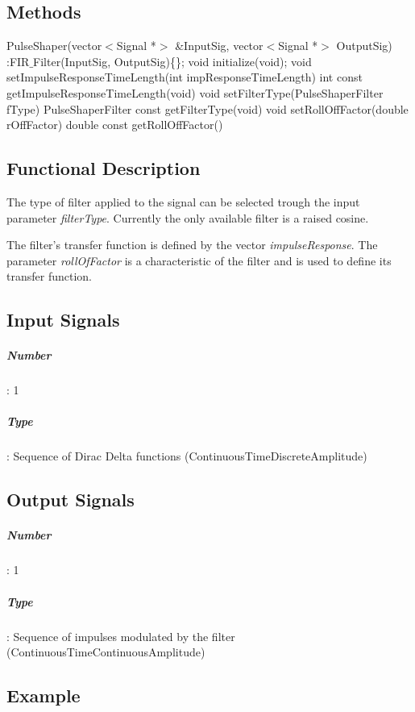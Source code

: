 \subsection*{Methods}

PulseShaper(vector$<$Signal *$>$ \&InputSig, vector$<$Signal *$>$ OutputSig) :FIR$\_$Filter(InputSig, OutputSig)\{\};
\bigbreak	
void initialize(void);
\bigbreak	
void setImpulseResponseTimeLength(int impResponseTimeLength)
\bigbreak
int const getImpulseResponseTimeLength(void)
\bigbreak	
void setFilterType(PulseShaperFilter fType)
\bigbreak
PulseShaperFilter const getFilterType(void)
\bigbreak	
void setRollOffFactor(double rOffFactor)
\bigbreak
double const getRollOffFactor()

\subsection*{Functional Description}

The type of filter applied to the signal can be selected trough the input parameter \textit{filterType}. Currently the only available filter is a raised cosine.

The filter's transfer function is defined by the vector \textit{impulseResponse}. The parameter \textit{rollOfFactor} is a characteristic of the filter and is used to define its transfer function.

\subsection*{Input Signals}

\subparagraph*{Number}: 1

\subparagraph*{Type}: Sequence of Dirac Delta functions (ContinuousTimeDiscreteAmplitude)

\subsection*{Output Signals}

\subparagraph*{Number}: 1

\subparagraph*{Type}: Sequence of impulses modulated by the filter (ContinuousTimeContinuousAmplitude)

\subsection*{Example}

